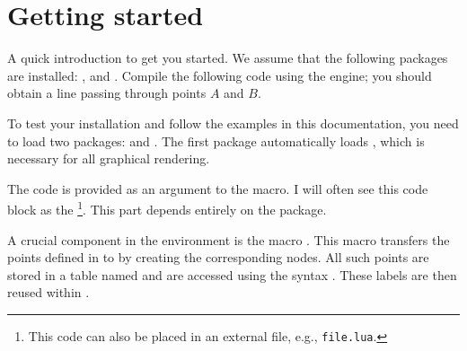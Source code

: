 \section{Getting started}

A quick introduction to get you started. We assume that the following packages are installed:  , and .
Compile the following code using the  engine; you should obtain a line passing through points $A$ and $B$.

\begin{minipage}{.6\textwidth}
\end{minipage}
\begin{minipage}{.4\textwidth}
\end{minipage}

To test your installation and follow the examples in this documentation, you need to load two packages:  and . The first package automatically loads \tkzNamePack{\TIKZ}, which is necessary for all graphical rendering.


The  code is provided as an argument to the  macro. I will often see  this code block as the \footnote{This code can also be placed in an external file, e.g., \texttt{file.lua}.}. This part depends entirely on the  package.

A crucial component in the  environment is the macro . This macro transfers the points defined in  to \tkzNamePack{\TIKZ} by creating the corresponding nodes. All such points are stored in a table named  and are accessed using the syntax . These labels are then reused within .

